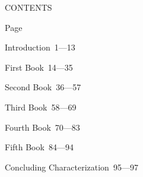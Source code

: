 \documentclass[12pt]{article}
\newcommand{\tocline}[2]{\noindent #1\dotfill\ #2\par}
\begin{document}
\clearpage
\begin{center}{\large CONTENTS}\end{center}
\medskip
\hfill{\scriptsize Page}\par
\tocline{Introduction}{1---13}
\tocline{First Book}{14---35}
\tocline{Second Book}{36---57}
\tocline{Third Book}{58---69}
\tocline{Fourth Book}{70---83}
\tocline{Fifth Book}{84---94}
\tocline{Concluding Characterization}{95---97}
\end{document}
